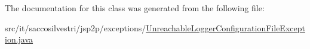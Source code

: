 \-The documentation for this class was generated from the following file\-:\begin{DoxyCompactItemize}
\item 
src/it/saccosilvestri/jsp2p/exceptions/\hyperlink{_unreachable_logger_configuration_file_exception_8java}{\-Unreachable\-Logger\-Configuration\-File\-Exception.\-java}\end{DoxyCompactItemize}
